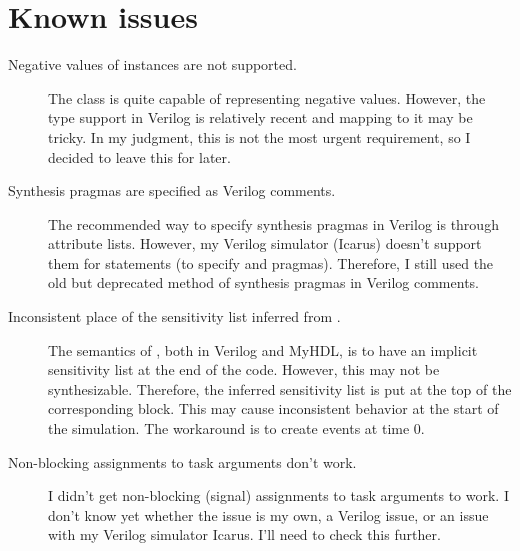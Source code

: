 \documentclass{howto}
\newcommand{\myhdl}{\protect \mbox{MyHDL}}
\begin{document}
\section{Known issues}
\begin{description}

\item[Negative values of  instances are not supported.]
The  class is quite capable of representing negative
values. However, the  type support in Verilog is
relatively recent and mapping to it may be tricky. In my judgment,
this is not the most urgent requirement, so
I decided to leave this for later.

\item[Synthesis pragmas are specified as Verilog comments.] The recommended
way to specify synthesis pragmas in Verilog is through attribute
lists. However, my Verilog simulator (Icarus) doesn't support them
for  statements (to specify  and
 pragmas). Therefore, I still used the old
but deprecated method of synthesis pragmas in Verilog comments.

\item[Inconsistent place of the sensitivity list inferred from .]
The semantics of , both in Verilog and \myhdl{}, is to
have an implicit sensitivity list at the end of the code. However, this
may not be synthesizable. Therefore, the inferred sensitivity list is
put at the top of the corresponding  block.
This may cause inconsistent behavior at the start of the
simulation. The workaround is to create events at time 0.

\item[Non-blocking assignments to task arguments don't work.] 
I didn't get non-blocking (signal) assignments to task arguments to
work.  I don't know yet whether the issue is my own, a Verilog issue,
or an issue with my Verilog simulator Icarus. I'll need to check this
further.


\end{description}
\end{document}
